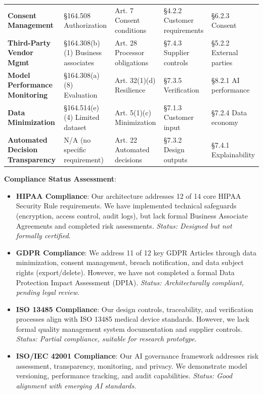 \documentclass[12pt,a4paper]{article}
\begin{document}
\begin{table}[H]
\begin{tabular}{@{}p{3.5cm}p{2.5cm}p{2.2cm}p{2.2cm}p{2cm}@{}}
\textbf{Consent Management} & 
§164.508 Authorization & 
Art. 7 Consent conditions & 
§4.2.2 Customer requirements & 
§6.2.3 Consent \\

\textbf{Third-Party Vendor Mgmt} & 
§164.308(b)(1) Business associates & 
Art. 28 Processor obligations & 
§7.4.3 Supplier controls & 
§5.2.2 External parties \\

\textbf{Model Performance Monitoring} & 
§164.308(a)(8) Evaluation & 
Art. 32(1)(d) Resilience & 
§7.3.5 Verification & 
§8.2.1 AI performance \\

\textbf{Data Minimization} & 
§164.514(e)(4) Limited dataset & 
Art. 5(1)(c) Minimization & 
§7.1.3 Customer input & 
§7.2.4 Data economy \\

\textbf{Automated Decision Transparency} & 
N/A (no specific requirement) & 
Art. 22 Automated decisions & 
§7.3.2 Design outputs & 
§7.4.1 Explainability \\

\bottomrule
\end{tabular}
\end{table}

\textbf{Compliance Status Assessment}:

\begin{itemize}
    \item \textbf{HIPAA Compliance}: Our architecture addresses 12 of 14 core HIPAA Security Rule requirements. We have implemented technical safeguards (encryption, access control, audit logs), but lack formal Business Associate Agreements and completed risk assessments. \textit{Status: Designed but not formally certified}.
    
    \item \textbf{GDPR Compliance}: We address 11 of 12 key GDPR Articles through data minimization, consent management, breach notification, and data subject rights (export/delete). However, we have not completed a formal Data Protection Impact Assessment (DPIA). \textit{Status: Architecturally compliant, pending legal review}.
    
    \item \textbf{ISO 13485 Compliance}: Our design controls, traceability, and verification processes align with ISO 13485 medical device standards. However, we lack formal quality management system documentation and supplier controls. \textit{Status: Partial compliance, suitable for research prototype}.
    
    \item \textbf{ISO/IEC 42001 Compliance}: Our AI governance framework addresses risk assessment, transparency, monitoring, and privacy. We demonstrate model versioning, performance tracking, and audit capabilities. \textit{Status: Good alignment with emerging AI standards}.
\end{itemize}
\end{document}
